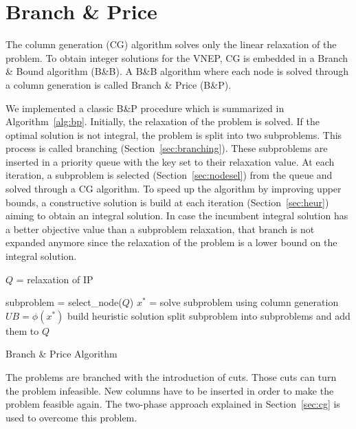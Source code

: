 \documentclass[conference]{IEEEtran}
\begin{document}

\section{Branch \& Price}
\label{sec:bp}

The column generation (CG) algorithm solves only the linear relaxation of the problem.
To obtain integer solutions for the VNEP, CG is embedded in a Branch \& Bound algorithm (B\&B).
A B\&B algorithm where each node is solved through a column generation is called Branch \& Price (B\&P).

We implemented a classic B\&P procedure which is summarized in Algorithm~\ref{alg:bp}.
Initially, the relaxation of the problem is solved.
If the optimal solution is not integral, the problem is split into two subproblems.
This process is called branching (Section~\ref{sec:branching}).
These subproblems are inserted in a priority queue with the key set to their relaxation value.
At each iteration, a subproblem is selected (Section~\ref{sec:nodesel}) from the queue and solved through a CG algorithm.
To speed up the algorithm by improving upper bounds, a constructive solution is build at each iteration (Section~\ref{sec:heur}) aiming to obtain an integral solution.
In case the incumbent integral solution has a better objective value than a subproblem relaxation, that branch is not expanded anymore since the relaxation of the problem is a lower bound on the integral solution.

\begin{algorithm}
$Q$ = {relaxation of IP}

  {
    subproblem = select\_node($Q$)\; \label{alg:genbp:snode}
    $x^*$ = solve subproblem using column generation\;
    {
      {$UB = \phi(x^*)$\;}
      {build heuristic solution\;
      split subproblem into subproblems and add them to $Q$\;\label{alg:bp:split}}
    }
  }
\caption{Branch \& Price Algorithm}
\label{alg:bp}
\end{algorithm}

The problems are branched with the introduction of cuts. Those cuts can turn the problem infeasible. 
New columns have to be inserted in order to make the problem feasible again.
The two-phase approach explained in Section~\ref{sec:cg} is used to overcome this problem.
\end{document}
